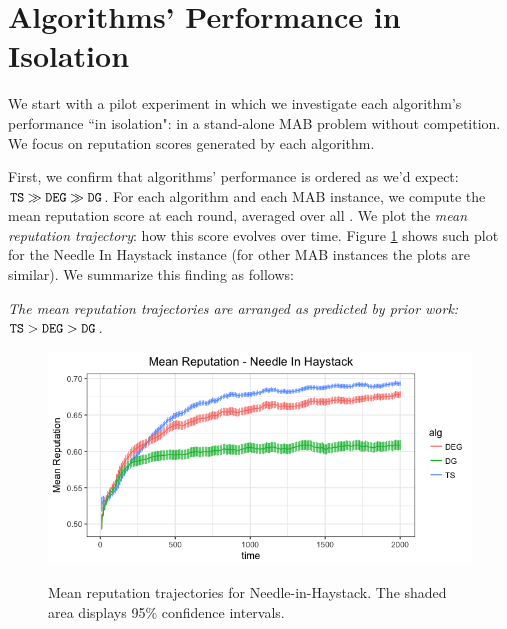 \documentclass[../competing_bandits.tex]{subfiles}
\begin{document}
\section{Algorithms' Performance in Isolation}\label{section:4}

We start with a pilot experiment in which we investigate each algorithm's performance ``in isolation": in a stand-alone MAB problem without competition. We focus on reputation scores generated by each algorithm.

First, we confirm that algorithms' performance is ordered as we'd expect:
    $\mathtt{TS} \gg \mathtt{DEG} \gg \mathtt{DG}$.
For each algorithm and each MAB instance, we compute the mean reputation score at each round, averaged over all \MRVs. We plot the \emph{mean reputation trajectory}: how this score evolves over time. Figure \ref{prelim_means} shows such plot for the Needle In Haystack instance (for other MAB instances the plots are similar). We summarize this finding as follows:

\begin{finding}
\textit{The mean reputation trajectories are arranged as predicted by prior work: 
    $\mathtt{TS} > \mathtt{DEG} > \mathtt{DG}$.}
\end{finding}


\begin{figure}
\caption{Mean reputation trajectories for Needle-in-Haystack. The shaded area displays 95\% confidence intervals.}
\includegraphics[scale=0.35]{"figures/nih_iso_mean"}
\label{prelim_means}
\end{figure}
\end{document}
